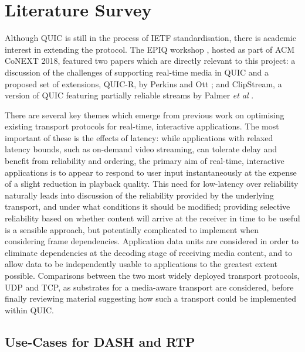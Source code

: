 \documentclass{mprop}
\begin{document}
\newpage

\section{Literature Survey}


Although QUIC is still in the process of IETF standardisation, there is academic interest in extending the protocol. The EPIQ workshop \cite{epiq}, hosted as part of ACM CoNEXT 2018, featured two papers which are directly relevant to this project: a discussion of the challenges of supporting real-time media in QUIC and a proposed set of extensions, QUIC-R, by Perkins and Ott \cite{Perkins2018}; and ClipStream, a version of QUIC featuring partially reliable streams by Palmer \textit{et al} \cite{Palmer2018}.

There are several key themes which emerge from previous work on optimising existing transport protocols for real-time, interactive applications. The most important of these is the effects of latency: while applications with relaxed latency bounds, such as on-demand video streaming, can tolerate delay and benefit from reliability and ordering, the primary aim of real-time, interactive applications is to appear to respond to user input instantaneously at the expense of a slight reduction in playback quality. This need for low-latency over reliability naturally leads into discussion of the reliability provided by the underlying transport, and under what conditions it should be modified; providing selective reliability based on whether content will arrive at the receiver in time to be useful is a sensible approach, but potentially complicated to implement when considering frame dependencies. Application data units are considered in order to eliminate dependencies at the decoding stage of receiving media content, and to allow data to be independently usable to applications to the greatest extent possible. Comparisons between the two most widely deployed transport protocols, UDP and TCP, as substrates for a media-aware transport are considered, before finally reviewing material suggesting how such a transport could be implemented within QUIC.

\subsection{Use-Cases for DASH and RTP}
\end{document}

